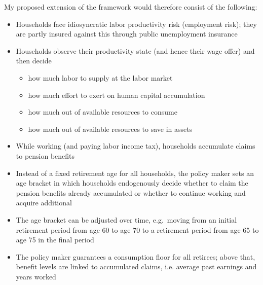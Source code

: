 My proposed extension of the framework would therefore consist of the following:
\begin{itemize}
    \item Households face idiosyncratic labor productivity risk (employment risk); they are partly insured against this through public unemployment insurance
    \item Households observe their productivity state (and hence their wage offer) and then decide
        \begin{itemize}
            \item how much labor to supply at the labor market
            \item how much effort to exert on human capital accumulation
            \item how much out of available resources to consume
            \item how much out of available resources to save in assets
        \end{itemize}
    \item While working (and paying labor income tax), households accumulate claims to pension benefits
    \item Instead of a fixed retirement age for all households, the policy maker sets an age bracket in which households endogenously decide whether to claim the pension benefits already accumulated or whether to continue working and acquire additional
    \item The age bracket can be adjusted over time, e.g.\ moving from an initial retirement period from age 60 to age 70 to a retirement period from age 65 to age 75 in the final period
    \item The policy maker guarantees a consumption floor for all retirees; above that, benefit levels are linked to accumulated claims, i.e. average past earnings and years worked
\end{itemize}

